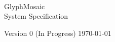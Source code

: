 \begin{titlepage}
  \begin{center}
     \\
    \Huge
    GlyphMosaic \\
    \vfill
    \LARGE
    System Specification
  \end{center}

    \vfill
    \vfill
    \vfill
    \vfill


  \vspace{1em}

  \large
  Version 0 (In Progress) \newline
  \today
  \normalsize
\end{titlepage}
\restoregeometry
